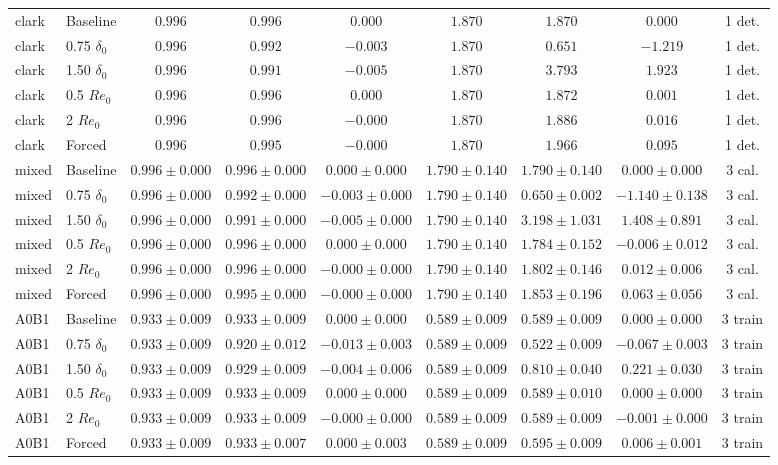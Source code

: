 \begin{landscape}
\begin{longtable}{llccccccc}
clark & Baseline & $0.996$ & $0.996$ & $0.000$ & $1.870$ & $1.870$ & $0.000$ & 1 det. \\
clark & 0.75 $\delta_0$ & $0.996$ & $0.992$ & $-0.003$ & $1.870$ & $0.651$ & $-1.219$ & 1 det. \\
clark & 1.50 $\delta_0$ & $0.996$ & $0.991$ & $-0.005$ & $1.870$ & $3.793$ & $1.923$ & 1 det. \\
clark & 0.5 $Re_0$ & $0.996$ & $0.996$ & $0.000$ & $1.870$ & $1.872$ & $0.001$ & 1 det. \\
clark & 2 $Re_0$ & $0.996$ & $0.996$ & $-0.000$ & $1.870$ & $1.886$ & $0.016$ & 1 det. \\
clark & Forced & $0.996$ & $0.995$ & $-0.000$ & $1.870$ & $1.966$ & $0.095$ & 1 det. \\
mixed & Baseline & $0.996\pm0.000$ & $0.996\pm0.000$ & $0.000\pm0.000$ & $1.790\pm0.140$ & $1.790\pm0.140$ & $0.000\pm0.000$ & 3 cal. \\
mixed & 0.75 $\delta_0$ & $0.996\pm0.000$ & $0.992\pm0.000$ & $-0.003\pm0.000$ & $1.790\pm0.140$ & $0.650\pm0.002$ & $-1.140\pm0.138$ & 3 cal. \\
mixed & 1.50 $\delta_0$ & $0.996\pm0.000$ & $0.991\pm0.000$ & $-0.005\pm0.000$ & $1.790\pm0.140$ & $3.198\pm1.031$ & $1.408\pm0.891$ & 3 cal. \\
mixed & 0.5 $Re_0$ & $0.996\pm0.000$ & $0.996\pm0.000$ & $0.000\pm0.000$ & $1.790\pm0.140$ & $1.784\pm0.152$ & $-0.006\pm0.012$ & 3 cal. \\
mixed & 2 $Re_0$ & $0.996\pm0.000$ & $0.996\pm0.000$ & $-0.000\pm0.000$ & $1.790\pm0.140$ & $1.802\pm0.146$ & $0.012\pm0.006$ & 3 cal. \\
mixed & Forced & $0.996\pm0.000$ & $0.995\pm0.000$ & $-0.000\pm0.000$ & $1.790\pm0.140$ & $1.853\pm0.196$ & $0.063\pm0.056$ & 3 cal. \\
A0B1 & Baseline & $0.933\pm0.009$ & $0.933\pm0.009$ & $0.000\pm0.000$ & $0.589\pm0.009$ & $0.589\pm0.009$ & $0.000\pm0.000$ & 3 train \\
A0B1 & 0.75 $\delta_0$ & $0.933\pm0.009$ & $0.920\pm0.012$ & $-0.013\pm0.003$ & $0.589\pm0.009$ & $0.522\pm0.009$ & $-0.067\pm0.003$ & 3 train \\
A0B1 & 1.50 $\delta_0$ & $0.933\pm0.009$ & $0.929\pm0.009$ & $-0.004\pm0.006$ & $0.589\pm0.009$ & $0.810\pm0.040$ & $0.221\pm0.030$ & 3 train \\
A0B1 & 0.5 $Re_0$ & $0.933\pm0.009$ & $0.933\pm0.009$ & $0.000\pm0.000$ & $0.589\pm0.009$ & $0.589\pm0.010$ & $0.000\pm0.000$ & 3 train \\
A0B1 & 2 $Re_0$ & $0.933\pm0.009$ & $0.933\pm0.009$ & $-0.000\pm0.000$ & $0.589\pm0.009$ & $0.589\pm0.009$ & $-0.001\pm0.000$ & 3 train \\
A0B1 & Forced & $0.933\pm0.009$ & $0.933\pm0.007$ & $0.000\pm0.003$ & $0.589\pm0.009$ & $0.595\pm0.009$ & $0.006\pm0.001$ & 3 train \\
\bottomrule
\end{longtable}
\normalsize
\end{landscape}
